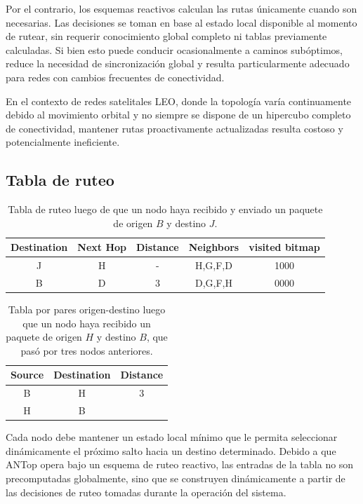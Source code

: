 Por el contrario, los esquemas reactivos calculan las rutas únicamente cuando son necesarias. Las decisiones se toman en base al estado local disponible al momento de rutear, sin requerir conocimiento global completo ni tablas previamente calculadas. Si bien esto puede conducir ocasionalmente a caminos subóptimos, reduce la necesidad de sincronización global y resulta particularmente adecuado para redes con cambios frecuentes de conectividad.

En el contexto de redes satelitales LEO, donde la topología varía continuamente debido al movimiento orbital y no siempre se dispone de un hipercubo completo de conectividad, mantener rutas proactivamente actualizadas resulta costoso y potencialmente ineficiente.

\subsection{Tabla de ruteo}

\begin{table}[]
    \centering
    \begin{tabular}{|c|c|c|c|c|}
        \hline
        Destination & Next Hop & Distance & Neighbors & visited bitmap \\
        \hline
        J & H & - & H,G,F,D & 1000 \\
        \hline
        B & D & 3 & D,G,F,H & 0000 \\
        \hline
    \end{tabular}
    \caption{Tabla de ruteo luego de que un nodo haya recibido y enviado un paquete de origen $B$ y destino $J$.}
    \label{tab:routing-table}
\end{table}

\begin{table}[]
    \centering
    \begin{tabular}{|c|c|c|}
        \hline
        Source & Destination & Distance \\
        \hline
        B & H & 3 \\
        \hline
        H & B & \\
        \hline
    \end{tabular}
    \caption{Tabla por pares origen-destino luego que un nodo haya recibido un paquete de origen $H$ y destino $B$, que pasó por tres nodos anteriores.}
    \label{tab:pair-table}
\end{table}

Cada nodo debe mantener un estado local mínimo que le permita seleccionar dinámicamente el próximo salto hacia un destino determinado. Debido a que ANTop opera bajo un esquema de ruteo reactivo, las entradas de la tabla no son precomputadas globalmente, sino que se construyen dinámicamente a partir de las decisiones de ruteo tomadas durante la operación del sistema.

